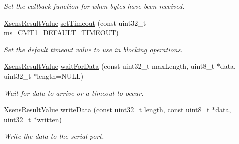 \begin{DoxyCompactItemize}
\begin{DoxyCompactList}\small\item\em \-Set the callback function for when bytes have been received. \end{DoxyCompactList}\item 
\hyperlink{group__enums_ga822a2260a20af524029eef9e9a51ff6f}{\-Xsens\-Result\-Value} \hyperlink{classxsens_1_1Cmt1s_ad54dc31ac6d752df1a0a6df736200860}{set\-Timeout} (const uint32\-\_\-t ms=\hyperlink{cmtdef_8h_a509daae051f48c297ddc9ced2c55a6c2}{\-C\-M\-T1\-\_\-\-D\-E\-F\-A\-U\-L\-T\-\_\-\-T\-I\-M\-E\-O\-U\-T})
\begin{DoxyCompactList}\small\item\em \-Set the default timeout value to use in blocking operations. \end{DoxyCompactList}\item 
\hyperlink{group__enums_ga822a2260a20af524029eef9e9a51ff6f}{\-Xsens\-Result\-Value} \hyperlink{classxsens_1_1Cmt1s_a7d186b7895b9ad7ba611f50fede6e7bf}{wait\-For\-Data} (const uint32\-\_\-t max\-Length, uint8\-\_\-t $\ast$data, uint32\-\_\-t $\ast$length=\-N\-U\-L\-L)
\begin{DoxyCompactList}\small\item\em \-Wait for data to arrive or a timeout to occur. \end{DoxyCompactList}\item 
\hyperlink{group__enums_ga822a2260a20af524029eef9e9a51ff6f}{\-Xsens\-Result\-Value} \hyperlink{classxsens_1_1Cmt1s_a733fc297e7c1d7639f60a7e6bc5ce3bd}{write\-Data} (const uint32\-\_\-t length, const uint8\-\_\-t $\ast$data, uint32\-\_\-t $\ast$written)
\begin{DoxyCompactList}\small\item\em \-Write the data to the serial port. \end{DoxyCompactList}\end{DoxyCompactItemize}

